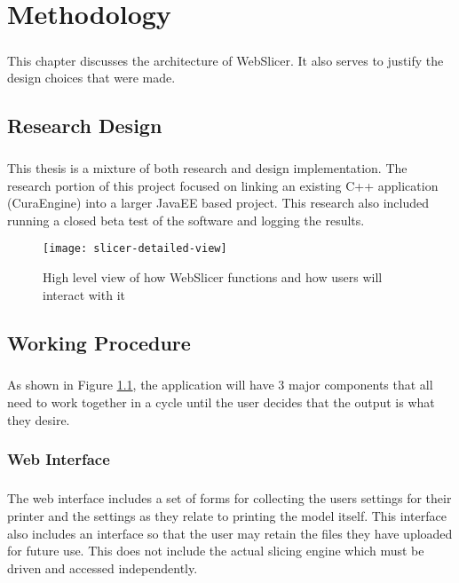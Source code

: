\chapter{Methodology}
\paragraph{}
This chapter discusses the architecture of WebSlicer. It also serves to justify the design choices that were made. 

\section{Research Design} 
\paragraph{}
This thesis is a mixture of both research and design implementation.
The research portion of this project focused on linking an existing C++ application (CuraEngine) into a larger JavaEE based project.
This research also included running a closed beta test of the software and logging the results.

\begin{figure}[!ht]
  \centering
  \texttt{[image: slicer-detailed-view]}
  \caption{High level view of how WebSlicer functions and how users will interact with it}
  \label{fig:slicer-detailed-view}
\end{figure}

\section{Working Procedure}
\paragraph{}
As shown in Figure \ref{fig:slicer-detailed-view}, the application will have 3 major components that all need to work together in a cycle until the user decides that the output is what they desire.

\subsection{Web Interface}
\paragraph{}
The web interface includes a set of forms for collecting the users settings for their printer and the settings as they relate to printing the model itself.
This interface also includes an interface so that the user may retain the files they have uploaded for future use.
This does not include the actual slicing engine which must be driven and accessed independently.

